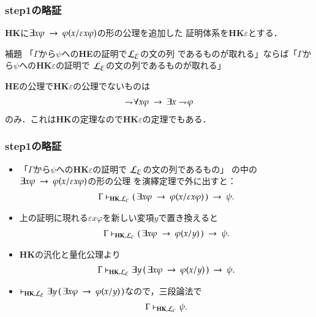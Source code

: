 \documentclass[dvipdfmx,10pt,notheorems]{beamer}
\theoremstyle{definition}
\newcommand{\lang}[1]{\mathcal{L}_{\scalebox{1.2}{$#1$}}} %
\newcommand{\provable}[1]{\vdash_{{\scriptsize #1}}} %
\newcommand{\negation}{\rightharpoondown\hspace{-0.25em}} %
\newcommand{\rarrow}{\hspace{0.25em}\rightarrow\hspace{0.25em}} %
\begin{document}
\begin{frame}\frametitle{step1の略証}
	{\bf HK}に$\exists x \varphi \rarrow \varphi(x/\varepsilon x \varphi)$の形の公理を追加した
	証明体系を{\bf HK$\varepsilon$}とする．
	\begin{block}{補題}
		「$\Gamma$から$\psi$への{\bf HE}の証明で$\lang{\varepsilon}$の文の列
		であるものが取れる」ならば「$\Gamma$から$\psi$への{\bf HK$\varepsilon$}の証明で
		$\lang{\varepsilon}$の文の列であるものが取れる」
	\end{block}
	
	{\bf HE}の公理で{\bf HK$\varepsilon$}の公理でないものは
	\begin{align}
		\negation \forall x \varphi \rarrow \exists x \negation \varphi
	\end{align}
	のみ．これは{\bf HK}の定理なので{\bf HK$\varepsilon$}の定理でもある．
\end{frame}

\begin{frame}\frametitle{step1の略証}
	\begin{itemize}
		\item 「$\Gamma$から$\psi$への{\bf HK$\varepsilon$}の証明で
			$\lang{\varepsilon}$の文の列であるもの」
			の中の$\exists x \varphi \rarrow \varphi(x/\varepsilon x \varphi)$の形の公理
			を演繹定理で外に出すと：
			\begin{align}
				\Gamma \provable{\mbox{{\bf HK}},\lang{\varepsilon}} 
				(\, \exists x \varphi \rarrow \varphi(x/\varepsilon x \varphi)\, ) \rarrow \psi.
			\end{align}
		\item 上の証明に現れる$\varepsilon x \varphi$を新しい変項$y$で置き換えると
			\begin{align}
				\Gamma \provable{\mbox{{\bf HK}},\lang{\varepsilon}} 
				(\, \exists x \varphi \rarrow \varphi(x/y)\, ) \rarrow \psi.
			\end{align}
			
		\item {\bf HK}の汎化と量化公理より
			\begin{align}
				\Gamma \provable{\mbox{{\bf HK}},\lang{\varepsilon}} 
				\exists y\, (\, \exists x \varphi \rarrow \varphi(x/y)\, ) \rarrow \psi.
			\end{align}
		
		\item $\provable{\mbox{{\bf HK}},\lang{\varepsilon}} 
			\exists y\, (\, \exists x \varphi \rarrow \varphi(x/y)\, )$なので，三段論法で
			\begin{align}
				\Gamma \provable{\mbox{{\bf HK}},\lang{\varepsilon}} \psi.
			\end{align}
	\end{itemize}
\end{frame}
\end{document}
